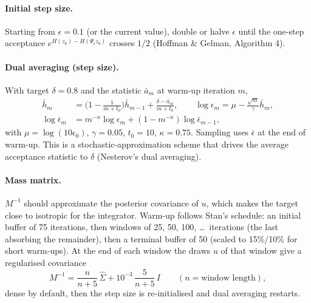 \documentclass[11pt]{article}
\theoremstyle{definition}
\theoremstyle{remark}
\begin{document}
\paragraph{Initial step size.} Starting from $\epsilon=0.1$ (or the current value), double or halve $\epsilon$ until the one-step acceptance $e^{H(z_0)-H(\Psi_\epsilon z_0)}$ crosses $1/2$ (Hoffman \& Gelman, Algorithm 4).

\paragraph{Dual averaging (step size).} With target $\delta=0.8$ and the statistic $\bar a_m$ at warm-up iteration $m$,
\begin{align*}
\bar h_m&=\Big(1-\frac1{m+t_0}\Big)\bar h_{m-1}+\frac{\delta-\bar a_m}{m+t_0},\qquad
\log\epsilon_m=\mu-\frac{\sqrt m}{\gamma}\bar h_m,\\
\log\bar\epsilon_m&=m^{-\kappa}\log\epsilon_m+(1-m^{-\kappa})\log\bar\epsilon_{m-1},
\end{align*}
with $\mu=\log(10\epsilon_0)$, $\gamma=0.05$, $t_0=10$, $\kappa=0.75$. Sampling uses $\bar\epsilon$ at the end of warm-up. This is a stochastic-approximation scheme that drives the average acceptance statistic to $\delta$ (Nesterov's dual averaging).

\paragraph{Mass matrix.} $M^{-1}$ should approximate the posterior covariance of $u$, which makes the target close to isotropic for the integrator. Warm-up follows Stan's schedule: an initial buffer of 75 iterations, then windows of 25, 50, 100, \dots\ iterations (the last absorbing the remainder), then a terminal buffer of 50 (scaled to 15\%/10\% for short warm-ups). At the end of each window the draws $u$ of that window give a regularised covariance
\[
M^{-1}=\frac{n}{n+5}\,\widehat\Sigma+10^{-3}\,\frac5{n+5}\,I\qquad(n=\text{window length}),
\]
dense by default, then the step size is re-initialised and dual averaging restarts.
\end{document}

